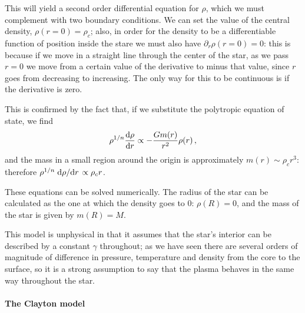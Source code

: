 \documentclass[main.tex]{subfiles}
\begin{document}
This will yield a second order differential equation for \(\rho \), which we must complement with two boundary conditions. 
We can set the value of the central density, \(\rho (r = 0) = \rho _c\); also, in order for the density to be a differentiable function of position inside the stare we must also have \(\partial_{r}\rho (r=0) = 0 \): this is because if we move in a straight line through the center of the star, as we pass \(r = 0\) we move from a certain value of the derivative to minus that value, since \(r\) goes from decreasing to increasing. The only way for this to be continuous is if the derivative is zero. 

This is confirmed by the fact that, if we substitute the polytropic equation of state, we find
%
%
%
\begin{align}
  \rho^{1/n} \dv{\rho }{r} \propto - \frac{Gm(r)}{r^2} \rho (r)
\,,
\end{align}
%
and the mass in a small region around the origin is approximately \(m(r) \sim \rho_c r^3\): therefore \(\rho^{1/n} \dv*{\rho }{r} \propto \rho _c r\). 

These equations can be solved numerically.
The radius of the star can be calculated as the one at which the density goes to 0: \(\rho (R) =0\), and the mass of the star is given by \(m(R) = M\). 

This model is unphysical in that it assumes that the star's interior can be described by a constant \(\gamma \) throughout; as we have seen there are several orders of magnitude of difference in pressure, temperature and density from the core to the surface, so it is a strong assumption to say that the plasma behaves in the same way throughout the star.

\paragraph{The Clayton model}
\end{document}
